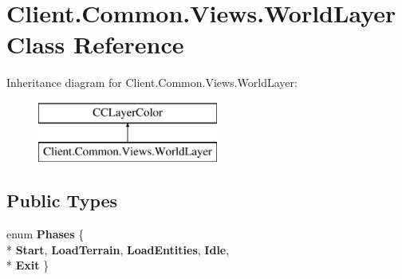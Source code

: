 \hypertarget{classClient_1_1Common_1_1Views_1_1WorldLayer}{\section{Client.\-Common.\-Views.\-World\-Layer Class Reference}
\label{classClient_1_1Common_1_1Views_1_1WorldLayer}
}
Inheritance diagram for Client.\-Common.\-Views.\-World\-Layer\-:\begin{figure}[H]
\begin{center}
\leavevmode
\includegraphics[height=2.000000cm]{classClient_1_1Common_1_1Views_1_1WorldLayer}
\end{center}
\end{figure}
\subsection*{Public Types}
\begin{DoxyCompactItemize}
\item 
enum {\bfseries Phases} \{ \\*
{\bfseries Start}, 
{\bfseries Load\-Terrain}, 
{\bfseries Load\-Entities}, 
{\bfseries Idle}, 
\\*
{\bfseries Exit}
 \}
\end{DoxyCompactItemize}

